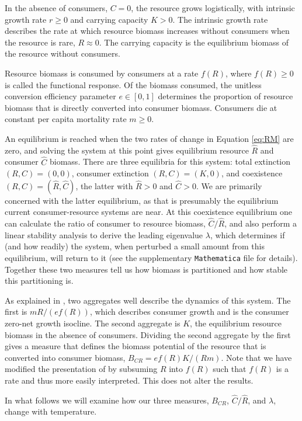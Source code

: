 \documentclass[letter,12pt]{article}
\begin{document}
In the absence of consumers, $C=0$, the resource grows logistically, with intrinsic growth rate $r\geq0$ and carrying capacity $K>0$.
The intrinsic growth rate describes the rate at which resource biomass increases without consumers when the resource is rare, $R\approx0$.
The carrying capacity is the equilibrium biomass of the resource without consumers.

Resource biomass is consumed by consumers at a rate $f(R)$, where $f(R)\geq0$ is called the functional response.
Of the biomass consumed, the unitless conversion efficiency parameter $e\in[0,1]$ determines the proportion of resource biomass that is directly converted into consumer biomass.
Consumers die at constant per capita mortality rate $m\geq0$.

An equilibrium is reached when the two rates of change in Equation \eqref{eq:RM} are zero, and solving the system at this point gives equilibrium resource $\hat{R}$ and consumer $\hat{C}$ biomass.
There are three equilibria for this system: total extinction $(R,C) = (0,0)$, consumer extinction $(R,C)=(K,0)$, and coexistence $(R,C)=(\hat{R},\hat{C})$, the latter with $\hat{R}>0$ and $\hat{C}>0$.
We are primarily concerned with the latter equilibrium, as that is presumably the equilibrium current consumer-resource systems are near.
At this coexistence equilibrium one can calculate the ratio of consumer to resource biomass, $\hat{C}/\hat{R}$, and also perform a linear stability analysis to derive the leading eigenvalue $\lambda$, which determines if (and how readily) the system, when perturbed a small amount from this equilibrium, will return to it (see the supplementary \texttt{Mathematica} file for details).
Together these two measures tell us how biomass is partitioned and how stable this partitioning is.

As explained in \cite{Gilbert2014}, two aggregates well describe the dynamics of this system.
The first is $m R/(e f(R))$, which describes consumer growth and is the consumer zero-net growth isocline.
The second aggregate is $K$, the equilibrium resource biomass in the absence of consumers.
Dividing the second aggregate by the first gives a measure that defines the biomass potential of the resource that is converted into consumer biomass, $B_{CR} = e f(R) K / (R m)$.
Note that we have modified the presentation of \cite{Gilbert2014} by subsuming $R$ into $f(R)$ such that $f(R)$ is  a rate and thus more easily interpreted.
This does not alter the results.

In what follows we will examine how our three measures, $B_{CR}$, $\hat{C}/\hat{R}$, and $\lambda$, change with temperature.
\end{document}
